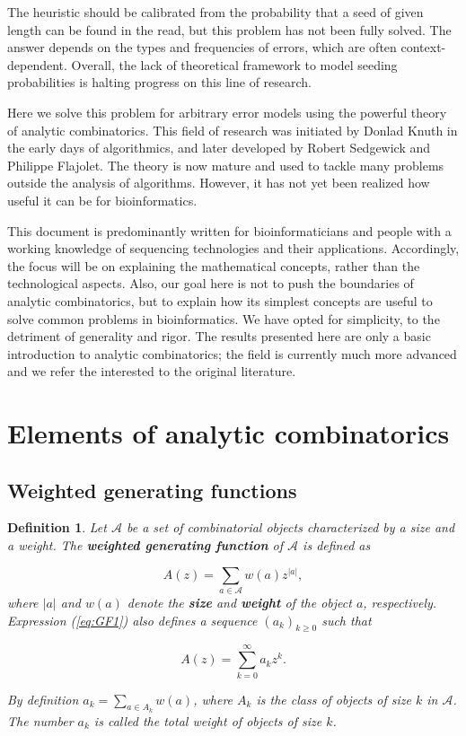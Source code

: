 \documentclass{article}
\newtheorem{definition}{Definition}
\begin{document}
The heuristic should be calibrated from the probability that a seed of
given length can be found in the read, but this problem has not been fully
solved. The answer depends on the types and frequencies of errors, which
are often context-dependent. Overall, the lack of theoretical framework to
model seeding probabilities is halting progress on this line of research.

Here we solve this problem for arbitrary error models using the powerful
theory of analytic combinatorics. This field of research was initiated by
Donlad Knuth in the early days of algorithmics, and later developed by
Robert Sedgewick and Philippe Flajolet. The theory is now mature and used
to tackle many problems outside the analysis of algorithms. However, it
has not yet been realized how useful it can be for bioinformatics.

This document is predominantly written for bioinformaticians and people
with a working knowledge of sequencing technologies and their applications.
Accordingly, the focus will be on explaining the mathematical concepts,
rather than the technological aspects. Also, our goal here is not to push
the boundaries of analytic combinatorics, but to explain how its simplest
concepts are useful to solve common problems in bioinformatics. We have
opted for simplicity, to the detriment of generality and rigor. The
results presented here are only a basic introduction to analytic
combinatorics; the field is currently much more advanced and we refer the
interested to the original literature.

\section{Elements of analytic combinatorics}
\label{sec:anal}

\subsection{Weighted generating functions}
\label{subsec:WGF}


\begin{definition}
\label{def:GF}
Let $\mathcal{A}$ be a set of combinatorial objects characterized by a
size and a weight. The \textbf{weighted generating function} of
$\mathcal{A}$ is defined as

\begin{equation}
\label{eq:GF1}
A(z) = \sum_{a \in \mathcal{A}} w(a) z^{|a|},
\end{equation}
where $|a|$ and $w(a)$ denote the \textbf{size} and \textbf{weight} of the
object $a$, respectively. Expression (\ref{eq:GF1}) also defines a
sequence $(a_k)_{k \geq 0}$ such that 

\begin{equation}
\label{eq:GF2}
A(z) = \sum_{k=0}^\infty a_k z^k.
\end{equation}

By definition $a_k = \sum_{a \in A_k}w(a)$, where $A_k$ is the class of
objects of size $k$ in $\mathcal{A}$. The number $a_k$ is called the total
weight of objects of size $k$.
\end{definition}
\end{document}

